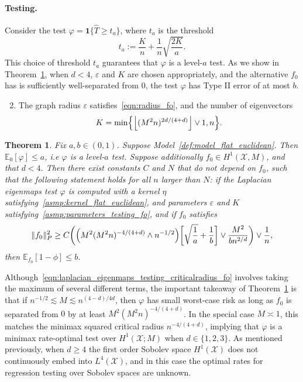 \documentclass{article}
\newcommand{\floor}[1]{\left\lfloor #1 \right\rfloor}
\newcommand{\1}{\mathbf{1}}
\newcommand{\Leb}{L}
\newcommand{\mc}[1]{\mathcal{#1}}
\newcommand{\Ebb}{\mathbb{E}}
\newcommand{\wh}[1]{\widehat{#1}}
\theoremstyle{alden}
\theoremstyle{aldenthm}
\newtheorem{theorem}{Theorem}
\theoremstyle{definition}
\theoremstyle{remark}
\begin{document}
\paragraph{Testing.} Consider the test $\varphi = \1\{\wh{T} \geq t_{a}\}$, where $t_{a}$ is the threshold
\begin{equation*}
t_{a} := \frac{K}{n} + \frac{1}{n}\sqrt{\frac{2K}{a}}.
\end{equation*}
This choice of threshold $t_{a}$ guarantees that $\varphi$ is a level-$a$ test. As we show in Theorem~\ref{thm:laplacian_eigenmaps_testing_fo}, when $d < 4$, $\varepsilon$ and $K$ are chosen appropriately, and the alternative $f_0$ has is sufficiently well-separated from $0$, the test $\varphi$ has Type II error of at most $b$.

\begin{enumerate}[label=(P\arabic*)]
	\setcounter{enumi}{1}
	\item 
	\label{asmp:parameters_testing_fo}
	The graph radius $\varepsilon$ satisfies~\eqref{eqn:radius_fo}, and the number of eigenvectors 
	\begin{equation}
	\label{eqn:eigenvector_testing_fo}
	K = \min\Bigl\{\floor{(M^2n)^{2d/(4 + d)}} \vee 1, n\Bigr\}.
	\end{equation}
\end{enumerate}
\begin{theorem}
	\label{thm:laplacian_eigenmaps_testing_fo}
	Fix $a,b \in (0,1)$. Suppose Model~\ref{def:model_flat_euclidean}. Then $\mathbb{E}_0[\varphi] \leq a$, i.e $\varphi$ is a level-$a$ test. Suppose additionally $f_0 \in H^1(\mc{X},M)$, and that $d < 4$. Then there exist constants $C$ and $N$ that do not depend on $f_0$, such that the following statement holds for all $n$ larger than $N$: if the Laplacian eigenmaps test $\varphi$ is computed with a kernel $\eta$ satisfying~\ref{asmp:kernel_flat_euclidean}, and parameters $\varepsilon$ and $K$ satisfying~\ref{asmp:parameters_testing_fo}, and if $f_0$ satisfies
	\begin{equation}
	\label{eqn:laplacian_eigenmaps_testing_criticalradius_fo}
	\|f_0\|_P^2 \geq C\biggl(\Bigl(M^2(M^2n)^{-4/(4 + d) } \wedge n^{-1/2}\Bigr)\biggl[\sqrt{\frac{1}{a}} + \frac{1}{b}\biggr] \vee \frac{M^2}{b n^{2/d}} \biggr) \vee \frac{1}{n},
	\end{equation}
	then $\Ebb_{f_0}[1 - \phi] \leq b$.
\end{theorem}
Although~\eqref{eqn:laplacian_eigenmaps_testing_criticalradius_fo} involves taking the maximum of several different terms, the important takeaway of Theorem~\ref{thm:laplacian_eigenmaps_testing_fo} is that if $n^{-1/2} \lesssim M \lesssim n^{(4 - d)/4d}$, then $\varphi$ has small worst-case risk as long as $f_0$ is separated from $0$ by at least $M^2(M^2n)^{-4/(4 + d)}$. In the special case $M \asymp 1$, this matches the minimax squared critical radius $n^{-4/(4 + d)}$, implying that $\varphi$ is a minimax rate-optimal test over $H^1(\mc{X};M)$ when $d \in \{1,2,3\}$. As mentioned previously, when $d \geq 4$ the first order Sobolev space $H^1(\mc{X})$ does not continuously embed into $\Leb^4(\mc{X})$, and in this case the optimal rates for regression testing over Sobolev spaces are unknown.
\end{document}
